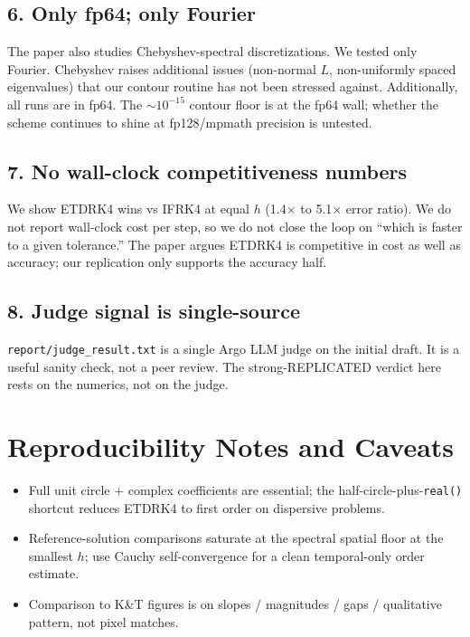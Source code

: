 \documentclass[11pt]{article}
\begin{document}
\subsection*{6. Only fp64; only Fourier}
The paper also studies Chebyshev-spectral discretizations. We tested
only Fourier. Chebyshev raises additional issues (non-normal $L$,
non-uniformly spaced eigenvalues) that our contour routine has not
been stressed against. Additionally, all runs are in fp64. The
$\sim 10^{-15}$ contour floor is at the fp64 wall; whether the
scheme continues to shine at fp128/mpmath precision is untested.

\subsection*{7. No wall-clock competitiveness numbers}
We show ETDRK4 wins vs IFRK4 at equal $h$ (1.4$\times$ to 5.1$\times$
error ratio). We do not report wall-clock cost per step, so we do not
close the loop on ``which is faster to a given tolerance.'' The paper
argues ETDRK4 is competitive in cost as well as accuracy; our
replication only supports the accuracy half.

\subsection*{8. Judge signal is single-source}
\texttt{report/judge\_result.txt} is a single Argo LLM judge on the
initial draft. It is a useful sanity check, not a peer review. The
strong-REPLICATED verdict here rests on the numerics, not on the judge.

\section{Reproducibility Notes and Caveats}
\begin{itemize}
\item Full unit circle + complex coefficients are essential; the
  half-circle-plus-\texttt{real()} shortcut reduces ETDRK4 to first
  order on dispersive problems.
\item Reference-solution comparisons saturate at the spectral spatial
  floor at the smallest $h$; use Cauchy self-convergence for a clean
  temporal-only order estimate.
\item Comparison to K\&T figures is on slopes / magnitudes / gaps /
  qualitative pattern, not pixel matches.
\end{itemize}
\end{document}
